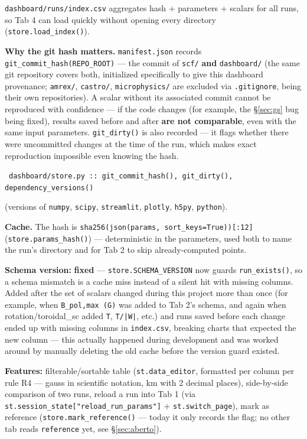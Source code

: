 \documentclass[11pt,a4paper]{scrartcl}
\newcommand{\arrowto}[1]{%
  \par\vspace{2pt}\noindent{\color{linkblue}$\rightarrow$}~\texttt{\small #1}\par\vspace{2pt}}
\newcommand{\code}[1]{\texttt{\small #1}}
\begin{document}
\code{dashboard/runs/index.csv} aggregates hash + parameters + scalars
for all runs, so Tab 4 can load quickly without opening every directory
(\code{store.load\_index()}).

\textbf{Why the git hash matters.} \code{manifest.json} records
\code{git\_commit\_hash(REPO\_ROOT)} --- the commit of \code{scf/}
\textbf{and} \code{dashboard/} (the same git repository covers both,
initialized specifically to give this dashboard provenance;
\code{amrex/}, \code{castro/}, \code{microphysics/} are excluded via
\code{.gitignore}, being their own repositories). A scalar without its
associated commit cannot be reproduced with confidence --- if the code
changes (for example, the \S\ref{sec:gs} bug being fixed), results saved
before and after \textbf{are not comparable}, even with the same input
parameters. \code{git\_dirty()} is also recorded --- it flags whether
there were uncommitted changes at the time of the run, which makes exact
reproduction impossible even knowing the hash.

\arrowto{dashboard/store.py :: git\_commit\_hash(), git\_dirty(), dependency\_versions()} (versions of \code{numpy}, \code{scipy}, \code{streamlit}, \code{plotly}, \code{h5py}, \code{python}).

\textbf{Cache.} The hash is \code{sha256(json(params, sort\_keys=True))[:12]}
(\code{store.params\_hash()}) --- deterministic in the parameters, used
both to name the run's directory and for Tab 2 to skip already-computed
points.

\textbf{Schema version:} \textbf{fixed} --- \code{store.SCHEMA\_VERSION}
now guards \code{run\_exists()}, so a schema mismatch is a cache miss
instead of a silent hit with missing columns. Added after the set of
scalars changed during this project more than once (for example, when
\code{B\_pol,max (G)} was added to Tab 2's schema, and again when
rotation/toroidal\_sc added \code{T}, \code{T/|W|}, etc.) and runs saved
before each change ended up with missing columns in \code{index.csv},
breaking charts that expected the new column --- this actually happened
during development and was worked around by manually deleting the old
cache before the version guard existed.

\textbf{Features:} filterable/sortable table (\code{st.data\_editor},
formatted per column per rule R4 --- gauss in scientific notation, km
with 2 decimal places), side-by-side comparison of two runs, reload a
run into Tab 1 (via \code{st.session\_state["reload\_run\_params"]} +
\code{st.switch\_page}), mark as reference (\code{store.mark\_reference()}
--- today it only records the flag; no other tab reads \code{reference}
yet, see \S\ref{sec:aberto}).
\end{document}

